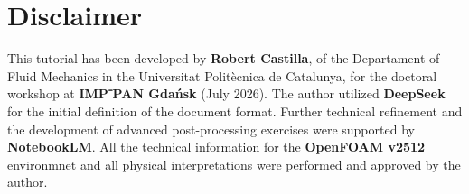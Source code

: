 \section*{Disclaimer}

This tutorial has been developed by \textbf{Robert Castilla}, 
of the Departament of Fluid
Mechanics in the Universitat Politècnica de Catalunya, for the doctoral 
workshop at \textbf{IMP⁻PAN Gda\'{n}sk} (July 2026). The author utilized \textbf{DeepSeek} for the initial
definition of the document format. Further technical refinement and the development
of advanced post-processing exercises were supported by \textbf{NotebookLM}. All the technical
information for the \textbf{OpenFOAM v2512} environmnet and all physical interpretations were
performed and approved by the author. 